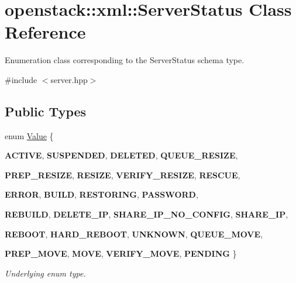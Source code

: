\hypertarget{classopenstack_1_1xml_1_1ServerStatus}{
\section{openstack::xml::ServerStatus Class Reference}
\label{classopenstack_1_1xml_1_1ServerStatus}
}


Enumeration class corresponding to the ServerStatus schema type.  




{\ttfamily \#include $<$server.hpp$>$}

\subsection*{Public Types}
\begin{DoxyCompactItemize}
\item 
enum \hyperlink{classopenstack_1_1xml_1_1ServerStatus_a086acdc13b219f6cb6547ec0d7783cb2}{Value} \{ \par
{\bfseries ACTIVE}, 
{\bfseries SUSPENDED}, 
{\bfseries DELETED}, 
{\bfseries QUEUE\_\-RESIZE}, 
\par
{\bfseries PREP\_\-RESIZE}, 
{\bfseries RESIZE}, 
{\bfseries VERIFY\_\-RESIZE}, 
{\bfseries RESCUE}, 
\par
{\bfseries ERROR}, 
{\bfseries BUILD}, 
{\bfseries RESTORING}, 
{\bfseries PASSWORD}, 
\par
{\bfseries REBUILD}, 
{\bfseries DELETE\_\-IP}, 
{\bfseries SHARE\_\-IP\_\-NO\_\-CONFIG}, 
{\bfseries SHARE\_\-IP}, 
\par
{\bfseries REBOOT}, 
{\bfseries HARD\_\-REBOOT}, 
{\bfseries UNKNOWN}, 
{\bfseries QUEUE\_\-MOVE}, 
\par
{\bfseries PREP\_\-MOVE}, 
{\bfseries MOVE}, 
{\bfseries VERIFY\_\-MOVE}, 
{\bfseries PENDING}
 \}
\begin{DoxyCompactList}\small\item\em Underlying enum type. \item\end{DoxyCompactList}\end{DoxyCompactItemize}
